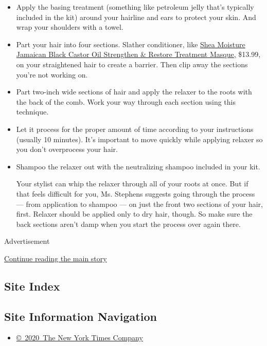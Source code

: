 \begin{itemize}
\item
  Apply the basing treatment (something like petroleum jelly that's
  typically included in the kit) around your hairline and ears to
  protect your skin. And wrap your shoulders with a towel.
\item
  Part your hair into four sections. Slather conditioner, like
  \href{https://www.sheamoisture.com/jamaican-black-castor-oil-strengthen-and-restore-treatment-masque/764302215554.html}{Shea
  Moisture Jamaican Black Castor Oil Strengthen \& Restore Treatment
  Masque,} \$13.99, on your straightened hair to create a barrier. Then
  clip away the sections you're not working on.
\item
  Part two-inch wide sections of hair and apply the relaxer to the roots
  with the back of the comb. Work your way through each section using
  this technique.
\item
  Let it process for the proper amount of time according to your
  instructions (usually 10 minutes). It's important to move quickly
  while applying relaxer so you don't overprocess your hair.
\item
  Shampoo the relaxer out with the neutralizing shampoo included in your
  kit.

  Your stylist can whip the relaxer through all of your roots at once.
  But if that feels difficult for you, Ms. Stephens suggests going
  through the process --- from application to shampoo --- on just the
  front two sections of your hair, first. Relaxer should be applied only
  to dry hair, though. So make sure the back sections aren't damp when
  you start the process over again there.
\end{itemize}

Advertisement

\protect\hyperlink{after-bottom}{Continue reading the main story}

\hypertarget{site-index}{%
\subsection{Site Index}\label{site-index}}

\hypertarget{site-information-navigation}{%
\subsection{Site Information
Navigation}\label{site-information-navigation}}

\begin{itemize}
\tightlist
\item
  \href{https://help.nytimes3xbfgragh.onion/hc/en-us/articles/115014792127-Copyright-notice}{©~2020~The
  New York Times Company}
\end{itemize}

